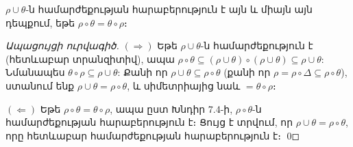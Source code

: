 $\rho\cup\theta$-ն համարժեքության հարաբերություն է այն և միայն այն դեպքում, եթե $\rho\circ\theta=\theta\circ\rho$։

\emph{Ապացույցի ուրվագիծ.}
$(\Rightarrow)$ Եթե $\rho\cup\theta$-ն համարժեքություն է (հետևաբար տրանզիտիվ), ապա $\rho\circ\theta\subseteq(\rho\cup\theta)\circ(\rho\cup\theta)\subseteq\rho\cup\theta$: Նմանապես $\theta\circ\rho\subseteq\rho\cup\theta$: Քանի որ $\rho\cup\theta\subseteq\rho\circ\theta$ (քանի որ $\rho=\rho\circ\Delta\subseteq\rho\circ\theta$), ստանում ենք $\rho\cup\theta=\rho\circ\theta$, և սիմետրիայից նաև $=\theta\circ\rho$։

$(\Leftarrow)$ Եթե $\rho\circ\theta=\theta\circ\rho$, ապա ըստ Խնդիր 7.4-ի, $\rho\circ\theta$-ն համարժեքության հարաբերություն է։ Ցույց է տրվում, որ $\rho\cup\theta=\rho\circ\theta$, որը հետևաբար համարժեքության հարաբերություն է։ \qed